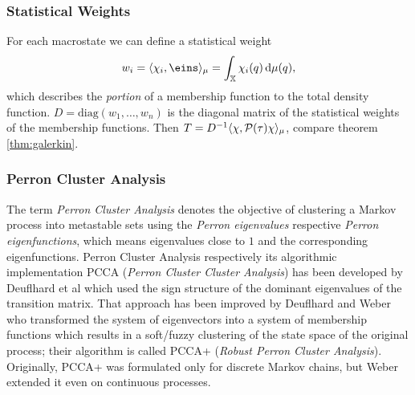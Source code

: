 \subsubsection*{Statistical Weights} 

For each macrostate we can define a statistical weight
\begin{equation*}
w_i = \langle \chi_i, \eins \rangle_\mu = \int_\X \chi_i(q) \diff \mu(q),
\end{equation*}
which describes the \textit{portion} of a membership function to the total density function. 
$D = \mathrm{diag}(w_1,\dots,w_n)$ is the diagonal matrix of the statistical weights of the membership functions. Then $T=D^{-1} \langle \chi, \mathcal{P}(\tau) \chi \rangle_\mu$, compare theorem \ref{thm:galerkin}.

\subsubsection*{Perron Cluster Analysis} 

The term \textit{Perron Cluster Analysis} denotes the objective of clustering a Markov process into metastable sets using the \textit{Perron eigenvalues} respective \textit{Perron eigenfunctions}, which means eigenvalues close to $1$ and the corresponding eigenfunctions.
Perron Cluster Analysis respectively its algorithmic implementation PCCA (\textit{Perron Cluster Cluster Analysis}) has been developed by Deuflhard et al\cite{deuflhard2000identification} which used the sign structure of the dominant eigenvalues of the transition matrix. 
That approach has been improved by Deuflhard and Weber\cite{deuflhard2005robust}
who transformed the system of eigenvectors into a system of membership functions which results in a soft/fuzzy clustering of the state space of the original process; their algorithm is called PCCA+
(\textit{Robust Perron Cluster Analysis}).
Originally, PCCA+ was formulated only for discrete Markov chains, but Weber\cite{weber2011subspace} extended it even on continuous processes.
\\


